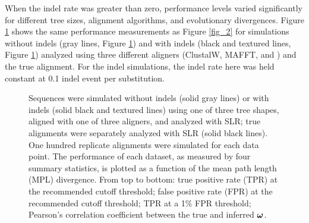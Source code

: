 \documentclass{article}
\begin{document}
When the indel rate was greater than zero, performance levels varied
significantly for different tree sizes, alignment algorithms, and
evolutionary divergences. Figure \ref{fig_3} shows the same
performance measurements as Figure \ref{fig_2} for simulations without
indels (gray lines, Figure \ref{fig_3}) and with indels (black and
textured lines, Figure \ref{fig_3}) analyzed using three different
aligners (ClustalW, MAFFT, and \prankc) and the true
alignment.  For the
indel simulations, the indel rate here was held constant at 0.1 indel
event per substitution.
\begin{figure}[t]
\begin{center}
\end{center}
\caption{Sequences were simulated without indels (solid gray lines) or with
  indels (solid black and textured lines) using one of three tree shapes, aligned with
  one of three aligners, and analyzed with SLR; true alignments were
  separately analyzed with SLR (solid black lines). One hundred
  replicate alignments were simulated for each data point. The
  performance of each dataset, as measured by four summary statistics,
  is plotted as a function of the mean path length (MPL)
  divergence. From top to bottom: true positive rate (TPR) at the
  recommended cutoff threshold; false positive rate (FPR) at the
  recommended cutoff threshold; TPR at a 1\% FPR threshold; Pearson's
  correlation coefficient between the true and inferred $\bm{\omega}$.}
\label{fig_3}
\end{figure}
\end{document}
